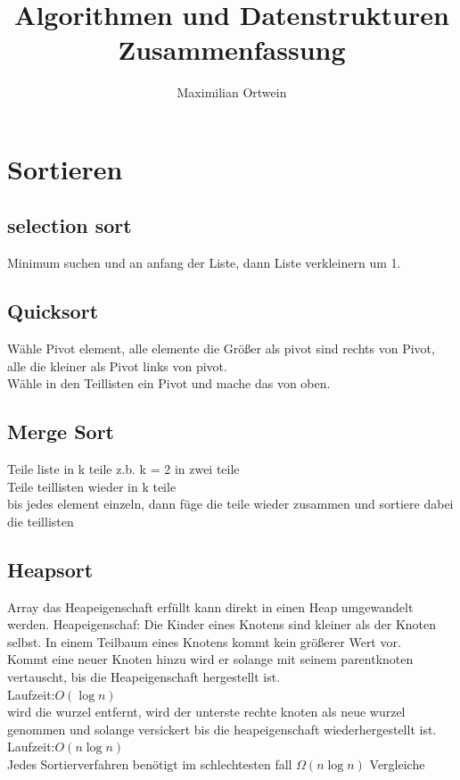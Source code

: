 \documentclass[a4paper]{scrartcl}
\begin{document}
\author{Maximilian Ortwein}
\title{Algorithmen und Datenstrukturen Zusammenfassung }
\fancyfoot[C]{\thepage}
\renewcommand{\footrulewidth}{0.5pt}
\renewcommand{\headrulewidth}{0.5pt}
\maketitle
\tableofcontents
\pagebreak

\section{Sortieren} 
\subsection{selection sort}
Minimum suchen und an anfang der Liste, dann Liste verkleinern um 1.
\subsection{Quicksort}
Wähle Pivot element, alle elemente die Größer als pivot sind rechts von Pivot, alle die kleiner als Pivot links von pivot.\\
Wähle in den Teillisten ein Pivot und mache das von oben.\\
\subsection{Merge Sort}
Teile liste in k teile z.b. k = 2 in zwei teile\\
Teile teillisten wieder in k teile\\
bis jedes element einzeln, dann füge die teile wieder zusammen und sortiere dabei die teillisten\\
\subsection{Heapsort}
Array das Heapeigenschaft erfüllt kann direkt in einen Heap umgewandelt werden. Heapeigenschaf: Die Kinder eines Knotens sind kleiner als der Knoten selbst. In einem Teilbaum eines Knotens kommt kein größerer Wert vor.\\
Kommt eine neuer Knoten hinzu wird er solange mit seinem parentknoten vertauscht, bis die Heapeigenschaft hergestellt ist. \\
Laufzeit:$O(\log n)$\\
wird die wurzel entfernt, wird der unterste rechte knoten als neue wurzel genommen und solange versickert bis die heapeigenschaft wiederhergestellt ist.
Laufzeit:$O(n\log n)$\\
Jedes Sortierverfahren benötigt im schlechtesten fall $\Omega (n \log n)$ Vergleiche\\
\end{document}
